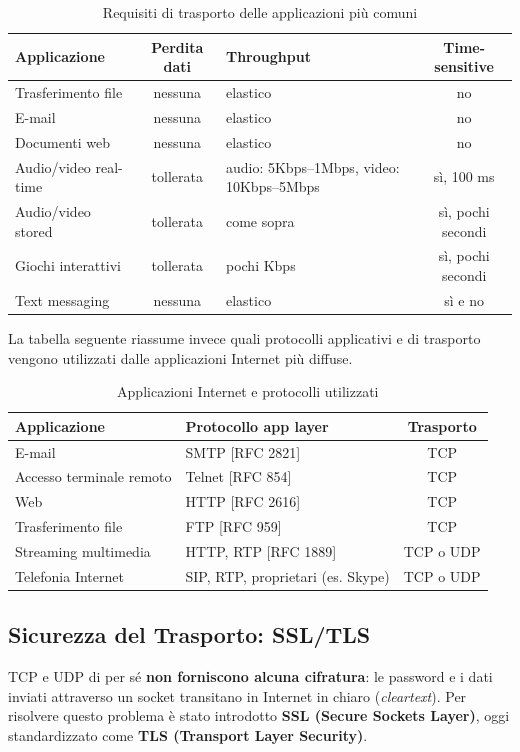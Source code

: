 \begin{table}[h]
\centering
\begin{tabularx}{\textwidth}{|X|c|X|c|}
\hline
\textbf{Applicazione} & \textbf{Perdita dati} & \textbf{Throughput} & \textbf{Time-sensitive} \\
\hline
Trasferimento file & nessuna & elastico & no \\
E-mail & nessuna & elastico & no \\
Documenti web & nessuna & elastico & no \\
Audio/video real-time & tollerata & audio: 5Kbps--1Mbps, video: 10Kbps--5Mbps & sì, 100 ms \\
Audio/video stored & tollerata & come sopra & sì, pochi secondi \\
Giochi interattivi & tollerata & pochi Kbps & sì, pochi secondi \\
Text messaging & nessuna & elastico & sì e no \\
\hline
\end{tabularx}
\caption{Requisiti di trasporto delle applicazioni più comuni}
\end{table}

La tabella seguente riassume invece quali protocolli applicativi e di trasporto vengono utilizzati dalle applicazioni Internet più diffuse.

\begin{table}[h]
\centering
\begin{tabularx}{\textwidth}{|X|X|c|}
\hline
\textbf{Applicazione} & \textbf{Protocollo app layer} & \textbf{Trasporto} \\
\hline
E-mail & SMTP [RFC 2821] & TCP \\
Accesso terminale remoto & Telnet [RFC 854] & TCP \\
Web & HTTP [RFC 2616] & TCP \\
Trasferimento file & FTP [RFC 959] & TCP \\
Streaming multimedia & HTTP, RTP [RFC 1889] & TCP o UDP \\
Telefonia Internet & SIP, RTP, proprietari (es. Skype) & TCP o UDP \\
\hline
\end{tabularx}
\caption{Applicazioni Internet e protocolli utilizzati}
\end{table}

\subsection{Sicurezza del Trasporto: SSL/TLS}
TCP e UDP di per sé \textbf{non forniscono alcuna cifratura}: le password e i dati inviati attraverso un socket transitano in Internet in chiaro (\textit{cleartext}). Per risolvere questo problema è stato introdotto \textbf{SSL (Secure Sockets Layer)}, oggi standardizzato come \textbf{TLS (Transport Layer Security)}.


